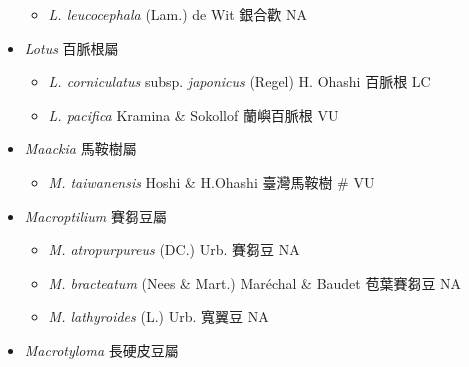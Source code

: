 \begin{itemize}
  \begin{itemize}
        \item[] \textit{L. leucocephala} (Lam.) de Wit  銀合歡   NA
  \end{itemize}
 \item[] \textit{Lotus} 百脈根屬
                                
  \begin{itemize}
        \item[] \textit{L. corniculatus} subsp. \textit{japonicus} (Regel) H. Ohashi  百脈根   LC
        \item[] \textit{L. pacifica} Kramina \& Sokollof  蘭嶼百脈根   VU
  \end{itemize}
 \item[] \textit{Maackia} 馬鞍樹屬
                                
  \begin{itemize}
        \item[] \textit{M. taiwanensis} Hoshi \& H.Ohashi  臺灣馬鞍樹  \# VU
  \end{itemize}
 \item[] \textit{Macroptilium} 賽芻豆屬
                                
  \begin{itemize}
        \item[] \textit{M. atropurpureus} (DC.) Urb.  賽芻豆   NA
        \item[] \textit{M. bracteatum} (Nees \& Mart.) Maréchal \& Baudet  苞葉賽芻豆   NA
        \item[] \textit{M. lathyroides} (L.) Urb.  寬翼豆   NA
  \end{itemize}
 \item[] \textit{Macrotyloma} 長硬皮豆屬
                                

\end{itemize}
